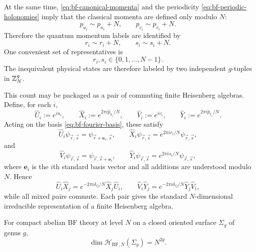 \medskip

\noindent At the same time, \eqref{eq:bf-canonical-momenta} and the periodicity \eqref{eq:bf-periodic-holonomies} imply that the classical momenta are defined only modulo $N$:
\begin{equation}\label{eq:bf-momentum-mod-N}
p_{u_i}\sim p_{u_i}+N,
\qquad
p_{v_i}\sim p_{v_i}+N.
\end{equation}
Therefore the quantum momentum labels are identified by
\begin{equation}\label{eq:bf-label-identification}
r_i\sim r_i+N,
\qquad
s_i\sim s_i+N.
\end{equation}
One convenient set of representatives is
\begin{equation}\label{eq:bf-basis-states}
r_i,s_i\in\{0,1,\dots,N-1\}.
\end{equation}
The inequivalent physical states are therefore labeled by two independent $g$-tuples in $\mathbb{Z}_N^g$.

\medskip

\noindent This count may be packaged as a pair of commuting finite Heisenberg algebras. Define, for each $i$,
\begin{equation}\label{eq:bf-heisenberg-ops}
\hat U_i:=e^{iu_i},
\qquad
\hat X_i:=e^{2\pi i \hat p_{u_i}/N},
\qquad
\hat V_i:=e^{iv_i},
\qquad
\hat Y_i:=e^{2\pi i \hat p_{v_i}/N}.
\end{equation}
Acting on the basis \eqref{eq:bf-fourier-basis}, these satisfy
\begin{equation*}
\hat U_i\psi_{\vec r,\vec s}=\psi_{\vec r+\mathbf e_i,\vec s},
\qquad
\hat X_i\psi_{\vec r,\vec s}=e^{2\pi i r_i/N}\psi_{\vec r,\vec s},
\end{equation*}
and
\begin{equation*}
\hat V_i\psi_{\vec r,\vec s}=\psi_{\vec r,\vec s+\mathbf e_i},
\qquad
\hat Y_i\psi_{\vec r,\vec s}=e^{2\pi i s_i/N}\psi_{\vec r,\vec s},
\end{equation*}
where $\mathbf e_i$ is the $i$th standard basis vector and all additions are understood modulo $N$. Hence
\begin{equation}\label{eq:bf-heisenberg-relations}
\hat U_i\hat X_j=e^{-2\pi i\delta_{ij}/N}\hat X_j\hat U_i,
\qquad
\hat V_i\hat Y_j=e^{-2\pi i\delta_{ij}/N}\hat Y_j\hat V_i,
\end{equation}
while all mixed pairs commute. Each pair gives the standard $N$-dimensional irreducible representation of a finite Heisenberg algebra.

\begin{proposition}\label{prop:bf-gsd}
For compact abelian BF theory at level $N$ on a closed oriented surface $\Sigma_g$ of genus $g$,
\begin{equation}\label{eq:bf-gsd}
\dim \mathcal{H}_{\mathrm{BF},N}(\Sigma_g)=N^{2g}.
\end{equation}
\end{proposition}

